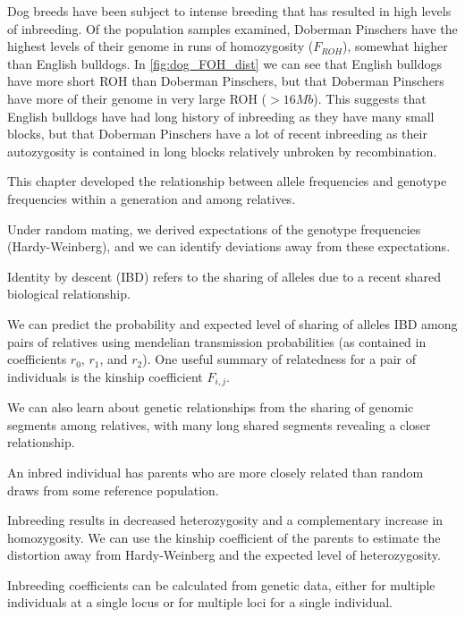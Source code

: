 Dog breeds have been subject
to intense breeding that has resulted in high levels of inbreeding. Of the population samples examined, Doberman Pinschers have the highest levels of their genome in runs of
homozygosity ($F_{ROH}$), somewhat higher than English bulldogs. In
\ref{fig:dog_FOH_dist} we can see that English bulldogs have more
short ROH than Doberman Pinschers, but that Doberman Pinschers have
more of their genome in very large ROH ($>16 Mb$). This suggests that
English bulldogs have had long history of inbreeding as they have many
small blocks, but that Doberman Pinschers have a lot of recent
inbreeding as their autozygosity is contained in long blocks
relatively unbroken by recombination.


\begin{ChapterSummary}
\item This chapter developed the relationship between allele
  frequencies and genotype frequencies within a generation and among
  relatives. 
 \item Under random mating, we derived expectations of the genotype
   frequencies (Hardy-Weinberg), and we can identify deviations away from these
   expectations.
\item Identity by descent (IBD) refers to the sharing of alleles due to a
  recent shared biological relationship. 
\item We can predict the probability and expected level of sharing of
  alleles IBD among pairs of relatives using mendelian transmission
  probabilities (as contained in coefficients $r_0$, $r_1$, and $r_2$). One useful summary of
  relatedness for a pair of individuals is the kinship coefficient
  $F_{i,j}$.
 \item  We can also learn about genetic relationships from the sharing
   of genomic segments among relatives, with many long shared segments revealing a closer relationship.
 \item An inbred individual has parents who are more closely related than random draws from some reference population. 
\item Inbreeding results in decreased heterozygosity and a complementary increase in homozygosity. We can use the kinship
  coefficient of the parents to estimate the distortion away from
  Hardy-Weinberg and the expected level of heterozygosity. 
\item Inbreeding coefficients can be calculated from genetic data,
  either for multiple individuals at a single locus or for multiple loci for
  a single individual. 
\end{ChapterSummary}

